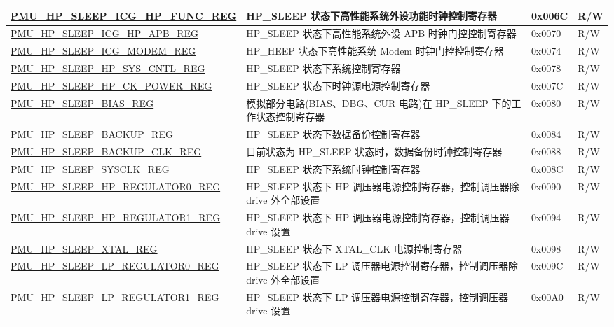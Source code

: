 \begin{longtable}{ | p{6.5cm} | p{8cm} | p{1.3cm} | p{1cm} | }
\hyperref[regdesc:PMUHPSLEEPICGHPFUNCREG]{PMU\_HP\_SLEEP\_ICG\_HP\_FUNC\_REG} & HP\_SLEEP 状态下高性能系统外设功能时钟控制寄存器 & 0x006C & R/W \\ \hline
\hyperref[regdesc:PMUHPSLEEPICGHPAPBREG]{PMU\_HP\_SLEEP\_ICG\_HP\_APB\_REG} & HP\_SLEEP 状态下高性能系统外设 APB 时钟门控控制寄存器 & 0x0070 & R/W \\ \hline
\hyperref[regdesc:PMUHPSLEEPICGMODEMREG]{PMU\_HP\_SLEEP\_ICG\_MODEM\_REG} & HP\_HEEP 状态下高性能系统 Modem 时钟门控控制寄存器 & 0x0074 & R/W \\ \hline
\hyperref[regdesc:PMUHPSLEEPHPSYSCNTLREG]{PMU\_HP\_SLEEP\_HP\_SYS\_CNTL\_REG} & HP\_SLEEP 状态下系统控制寄存器 & 0x0078 & R/W \\ \hline
\hyperref[regdesc:PMUHPSLEEPHPCKPOWERREG]{PMU\_HP\_SLEEP\_HP\_CK\_POWER\_REG} & HP\_SLEEP 状态下时钟源电源控制寄存器 & 0x007C & R/W \\ \hline
\hyperref[regdesc:PMUHPSLEEPBIASREG]{PMU\_HP\_SLEEP\_BIAS\_REG} & 模拟部分电路(BIAS、DBG、CUR 电路)在 HP\_SLEEP 下的工作状态控制寄存器 & 0x0080 & R/W \\ \hline
\hyperref[regdesc:PMUHPSLEEPBACKUPREG]{PMU\_HP\_SLEEP\_BACKUP\_REG} & HP\_SLEEP 状态下数据备份控制寄存器 & 0x0084 & R/W \\ \hline
\hyperref[regdesc:PMUHPSLEEPBACKUPCLKREG]{PMU\_HP\_SLEEP\_BACKUP\_CLK\_REG} & 目前状态为 HP\_SLEEP 状态时，数据备份时钟控制寄存器 & 0x0088 & R/W \\ \hline
\hyperref[regdesc:PMUHPSLEEPSYSCLKREG]{PMU\_HP\_SLEEP\_SYSCLK\_REG} & HP\_SLEEP 状态下系统时钟控制寄存器  & 0x008C & R/W \\ \hline
\hyperref[regdesc:PMUHPSLEEPHPREGULATOR0REG]{PMU\_HP\_SLEEP\_HP\_REGULATOR0\_REG} & HP\_SLEEP 状态下 HP 调压器电源控制寄存器，控制调压器除 drive 外全部设置 & 0x0090 & R/W \\ \hline
\hyperref[regdesc:PMUHPSLEEPHPREGULATOR1REG]{PMU\_HP\_SLEEP\_HP\_REGULATOR1\_REG} & HP\_SLEEP 状态下 HP 调压器电源控制寄存器，控制调压器 drive 设置 & 0x0094 & R/W \\ \hline
\hyperref[regdesc:PMUHPSLEEPXTALREG]{PMU\_HP\_SLEEP\_XTAL\_REG} & HP\_SLEEP 状态下 XTAL\_CLK 电源控制寄存器 & 0x0098 & R/W \\ \hline
\hyperref[regdesc:PMUHPSLEEPLPREGULATOR0REG]{PMU\_HP\_SLEEP\_LP\_REGULATOR0\_REG} & HP\_SLEEP 状态下 LP 调压器电源控制寄存器，控制调压器除 drive 外全部设置 & 0x009C & R/W \\ \hline
\hyperref[regdesc:PMUHPSLEEPLPREGULATOR1REG]{PMU\_HP\_SLEEP\_LP\_REGULATOR1\_REG} & HP\_SLEEP 状态下 LP 调压器电源控制寄存器，控制调压器 drive 设置 & 0x00A0 & R/W \\ \hline

\end{longtable}
